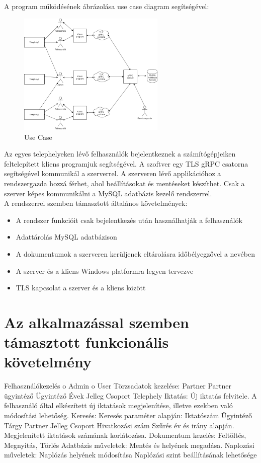 \documentclass[
]{thesis-ekf}
\theoremstyle{definition}
\theoremstyle{remark}
\begin{document}
A program működésének ábrázolása use case diagram segítségével:
\begin{figure}
	\centering
	\includegraphics[width=7cm]{archdiag}
	\caption[Use Case ábra]{Use Case}
	\label{fig:archdiag}
\end{figure}

Az egyes telephelyeken lévő felhasználók bejelentkeznek a számítógépjeiken feltelepített kliens programjuk segítségével. A szoftver egy TLS gRPC csatorna segítségével kommunikál a szerverrel. A szerveren lévő applikációhoz a rendszergazda hozzá férhet, ahol beállításokat és mentéseket készíthet. Csak a szerver képes kommunikálni a MySQL adatbázis kezelő rendszerrel.\\
A rendszerrel szemben támasztott általános követelmények:
\begin{itemize}
	\item A rendszer funkcióit csak bejelentkezés után használhatják a felhasználók
	\item Adattárolás MySQL adatbázison
	\item A dokumentumok a szerveren kerüljenek eltárolásra időbélyegzővel a nevében
	\item A szerver és a kliens Windows platformra legyen tervezve
	\item TLS kapcsolat a szerver és a kliens között
\end{itemize}
\section{Az alkalmazással szemben támasztott funkcionális követelmény}
Felhasználókezelés
o	Admin
o	User
Törzsadatok kezelése:
Partner
Partner ügyintéző
Ügyintéző
Évek
Jelleg
Csoport
Telephely
Iktatás:
Új iktatás felvitele. A felhasználó által elkészített új iktatások megjelenítése, illetve ezekben való módosítási lehetőség.
Keresés:
Keresés paraméter alapján:
Iktatószám
Ügyintéző
Tárgy
Partner
Jelleg
Csoport
Hivatkozási szám
Szűrés év és irány alapján.
Megjelenített iktatások számának korlátozása.
Dokumentum kezelés:
Feltöltés, Megnyitás, Törlés
Adatbázis műveletek:
Mentés és helyének megadása.
Naplozási műveletek:
Naplózás helyének módosítása
Naplózási szint beállításának lehetősége
\end{document}
